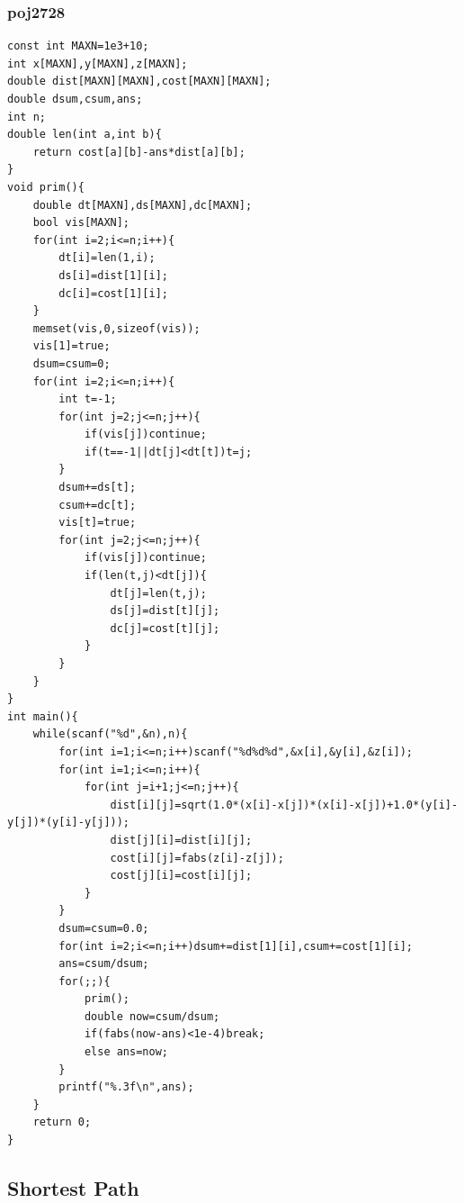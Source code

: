 \documentclass[twoside]{article}
\begin{document}
\subsubsection{poj2728}
\begin{lstlisting}
const int MAXN=1e3+10;
int x[MAXN],y[MAXN],z[MAXN];
double dist[MAXN][MAXN],cost[MAXN][MAXN];
double dsum,csum,ans;
int n;
double len(int a,int b){
    return cost[a][b]-ans*dist[a][b];
}
void prim(){
    double dt[MAXN],ds[MAXN],dc[MAXN];
    bool vis[MAXN];
    for(int i=2;i<=n;i++){
        dt[i]=len(1,i);
        ds[i]=dist[1][i];
        dc[i]=cost[1][i];
    }
    memset(vis,0,sizeof(vis));
    vis[1]=true;
    dsum=csum=0;
    for(int i=2;i<=n;i++){
        int t=-1;
        for(int j=2;j<=n;j++){
            if(vis[j])continue;
            if(t==-1||dt[j]<dt[t])t=j;
        }
        dsum+=ds[t];
        csum+=dc[t];
        vis[t]=true;
        for(int j=2;j<=n;j++){
            if(vis[j])continue;
            if(len(t,j)<dt[j]){
                dt[j]=len(t,j);
                ds[j]=dist[t][j];
                dc[j]=cost[t][j];
            }
        }
    }
}
int main(){
    while(scanf("%d",&n),n){
        for(int i=1;i<=n;i++)scanf("%d%d%d",&x[i],&y[i],&z[i]);
        for(int i=1;i<=n;i++){
            for(int j=i+1;j<=n;j++){
                dist[i][j]=sqrt(1.0*(x[i]-x[j])*(x[i]-x[j])+1.0*(y[i]-y[j])*(y[i]-y[j]));
                dist[j][i]=dist[i][j];
                cost[i][j]=fabs(z[i]-z[j]);
                cost[j][i]=cost[i][j];
            }
        }
        dsum=csum=0.0;
        for(int i=2;i<=n;i++)dsum+=dist[1][i],csum+=cost[1][i];
        ans=csum/dsum;
        for(;;){
            prim();
            double now=csum/dsum;
            if(fabs(now-ans)<1e-4)break;
            else ans=now;
        }
        printf("%.3f\n",ans);
    }
    return 0;
}
\end{lstlisting}
\subsection{Shortest Path}
\end{document}

